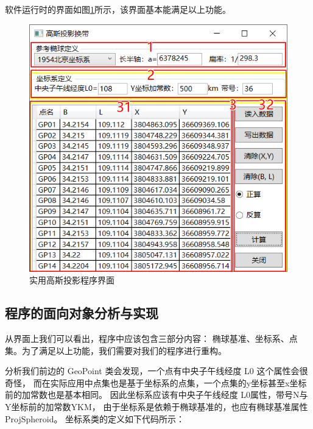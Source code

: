 软件运行时的界面如图\ref{fig:GaussProjUI02}所示，该界面基本能满足以上功能。

\begin{figure}[htbp]
    \centering
    \includegraphics[scale=1]{gaussProj/UI02.png}
    \caption{实用高斯投影程序界面}
    \label{fig:GaussProjUI02}
\end{figure}

\subsection{程序的面向对象分析与实现}

从界面上我们可以看出，程序中应该包含三部分内容：
椭球基准、坐标系、点集。为了满足以上功能，我们需要对我们的程序进行重构。

分析我们前边的 GeoPoint 类会发现，一个点有中央子午线经度 L0 这个属性会很奇怪，
而在实际应用中点集也是基于坐标系的点集，一个点集的y坐标甚至x坐标前的加常数也是基本相同。
因此坐标系应该有中央子午线经度 L0属性，带号N与Y坐标前的加常数YKM，
由于坐标系是依赖于椭球基准的，也应有椭球基准属性ProjSpheroid。
坐标系类的定义如下代码所示：

